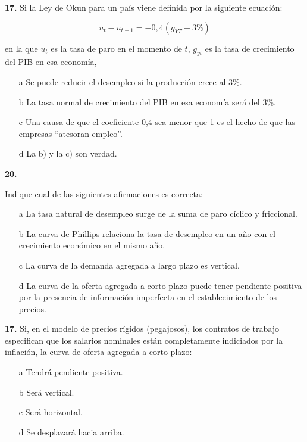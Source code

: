 \documentclass{nuevotema}
\begin{document}

\textbf{17.} Si la Ley de Okun para un país viene definida por la siguiente ecuación:

\begin{equation*}
u_t - u_{t-1} = -0,4 (g_{YT} -3 \%)
\end{equation*}

en la que $u_t$ es la tasa de paro en el momento de $t$, $g_{yt}$ es la tasa de crecimiento del PIB en esa economía,

\begin{itemize}
	\item[a] Se puede reducir el desempleo si la producción crece al 3\%.
	\item[b] La tasa normal de crecimiento del PIB en esa economía será del 3\%.
	\item[c] Una causa de que el coeficiente 0,4 sea menor que 1 es el hecho de que las empresas ``atesoran empleo''. 
	\item[d] La b) y la c) son verdad.
\end{itemize}

\textbf{20.}

Indique cual de las siguientes afirmaciones es correcta:

\begin{itemize}
	\item[a] La tasa natural de desempleo surge de la suma de paro cíclico y friccional.
	\item[b] La curva de Phillips relaciona la tasa de desempleo en un año con el crecimiento económico en el mismo año.
	\item[c] La curva de la demanda agregada a largo plazo es vertical.
	\item[d] La curva de la oferta agregada a corto plazo puede tener pendiente positiva por la presencia de información imperfecta en el establecimiento de los precios.
\end{itemize}


\textbf{17.} Si, en el modelo de precios rígidos (pegajosos), los contratos de trabajo especifican que los salarios nominales están completamente indiciados por la inflación, la curva de oferta agregada a corto plazo:
\begin{itemize}
	\item[a] Tendrá pendiente positiva.
	\item[b] Será vertical.
	\item[c] Será horizontal.
	\item[d] Se desplazará hacia arriba.
\end{itemize}
\end{document}
